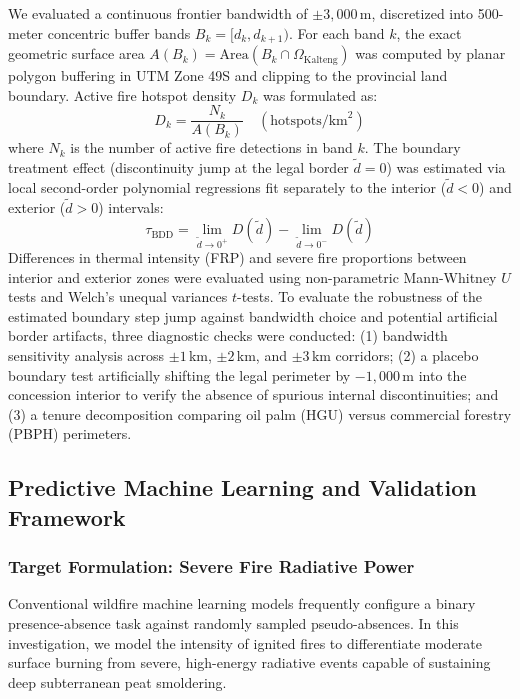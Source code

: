 We evaluated a continuous frontier bandwidth of $\pm 3,000$\,m, discretized into 500-meter concentric buffer bands $B_k = [d_k, d_{k+1})$. For each band $k$, the exact geometric surface area $A(B_k) = \text{Area}(B_k \cap \Omega_{\text{Kalteng}})$ was computed by planar polygon buffering in UTM Zone 49S and clipping to the provincial land boundary. Active fire hotspot density $D_k$ was formulated as:
\begin{equation}
D_k = \frac{N_k}{A(B_k)} \quad (\text{hotspots}/\text{km}^2)
\label{eq:density_bdd}
\end{equation}
where $N_k$ is the number of active fire detections in band $k$. The boundary treatment effect (discontinuity jump at the legal border $\tilde{d} = 0$) was estimated via local second-order polynomial regressions fit separately to the interior ($\tilde{d} < 0$) and exterior ($\tilde{d} > 0$) intervals:
\begin{equation}
\tau_{\text{BDD}} = \lim_{\tilde{d} \to 0^+} D(\tilde{d}) - \lim_{\tilde{d} \to 0^-} D(\tilde{d})
\label{eq:bdd_jump}
\end{equation}
Differences in thermal intensity (FRP) and severe fire proportions between interior and exterior zones were evaluated using non-parametric Mann-Whitney $U$ tests and Welch's unequal variances $t$-tests. To evaluate the robustness of the estimated boundary step jump against bandwidth choice and potential artificial border artifacts, three diagnostic checks were conducted: (1) bandwidth sensitivity analysis across $\pm 1$\,km, $\pm 2$\,km, and $\pm 3$\,km corridors; (2) a placebo boundary test artificially shifting the legal perimeter by $-1,000$\,m into the concession interior to verify the absence of spurious internal discontinuities; and (3) a tenure decomposition comparing oil palm (HGU) versus commercial forestry (PBPH) perimeters.

\subsection{Predictive Machine Learning and Validation Framework}
\label{subsec:ml_framework}

\subsubsection{Target Formulation: Severe Fire Radiative Power}
\label{subsubsec:target_def}

Conventional wildfire machine learning models frequently configure a binary presence-absence task against randomly sampled pseudo-absences. In this investigation, we model the intensity of ignited fires to differentiate moderate surface burning from severe, high-energy radiative events capable of sustaining deep subterranean peat smoldering.

